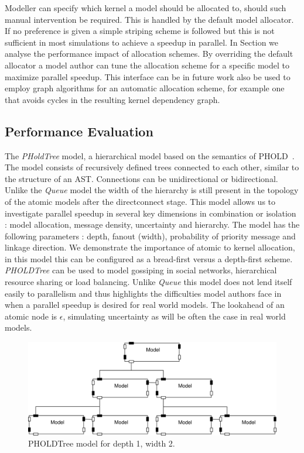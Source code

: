 Modeller can specify which kernel a model should be allocated to, should such manual intervention be required. This is handled by the default model allocator. If no preference is given a simple striping scheme is followed but this is not sufficient in most simulations to achieve a speedup in parallel. In Section  we analyse the performance impact of allocation schemes. By overriding the default allocator a model author can tune the allocation scheme for a specific model to maximize parallel speedup. This interface can be in future work also be used to employ graph algorithms for an automatic allocation scheme, for example one that avoids cycles in the resulting kernel dependency graph.

\subsection{Performance Evaluation}

The \textit{PHoldTree} model, a hierarchical model based on the semantics of PHOLD~\cite{PHOLD}. The model consists of recursively defined trees connected to each other, similar to the structure of an AST. Connections can be unidirectional or bidirectional.
Unlike the \textit{Queue} model the width of the hierarchy is still present in the topology of the atomic models after the directconnect stage. This model allows us to investigate parallel speedup in several key dimensions in combination or isolation : model allocation, message density, uncertainty and hierarchy. The model has the following parameters : depth, fanout (width), probability of priority message and linkage direction. We demonstrate the importance of atomic to kernel allocation, in this model this can be configured as a bread-first versus a depth-first scheme.
\textit{PHOLDTree} can be used to model gossiping in social networks, hierarchical resource sharing or load balancing. Unlike \textit{Queue} this model does not lend itself easily to parallelism and thus highlights the difficulties model authors face in when a parallel speedup is desired for real world models.
The lookahead of an atomic node is $\epsilon$, simulating uncertainty as will be often the case in real world models.

\begin{figure}
\includegraphics[width=\modelfraction\columnwidth]{fig/pholdtree.pdf}
\caption{PHOLDTree model for depth 1, width 2.}
\label{fig:PHOLDTree_model}
\end{figure}


